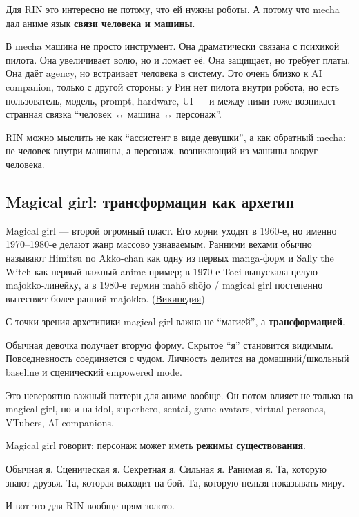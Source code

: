 Для RIN это интересно не потому, что ей нужны роботы. А потому что mecha
дал аниме язык \textbf{связи человека и машины}.

В mecha машина не просто инструмент. Она драматически связана с психикой
пилота. Она увеличивает волю, но и ломает её. Она защищает, но требует
платы. Она даёт agency, но встраивает человека в систему. Это очень
близко к AI companion, только с другой стороны: у Рин нет пилота внутри
робота, но есть пользователь, модель, prompt, hardware, UI --- и между
ними тоже возникает странная связка ``человек ↔ машина ↔ персонаж''.

RIN можно мыслить не как ``ассистент в виде девушки'', а как обратный
mecha: не человек внутри машины, а персонаж, возникающий из машины
вокруг человека.

\subsection*{Magical girl: трансформация как архетип}

Magical girl --- второй огромный пласт. Его корни уходят в 1960-е, но
именно 1970--1980-е делают жанр массово узнаваемым. Ранними вехами
обычно называют Himitsu no Akko-chan как одну из первых manga-форм и
Sally the Witch как первый важный anime-пример; в 1970-е Toei выпускала
целую majokko-линейку, а в 1980-е термин mahō shōjo /\hspace{0pt} magical girl
постепенно вытесняет более ранний majokko.
(\href{https://en.wikipedia.org/wiki/Magical_girl?utm_source=chatgpt.com}{Википедия})

С точки зрения архетипики magical girl важна не ``магией'', а
\textbf{трансформацией}.

Обычная девочка получает вторую форму. Скрытое ``я'' становится видимым.
Повседневность соединяется с чудом. Личность делится на
домашний/\hspace{0pt}школьный baseline и сценический empowered mode.

Это невероятно важный паттерн для аниме вообще. Он потом влияет не
только на magical girl, но и на idol, superhero, sentai, game avatars,
virtual personas, VTubers, AI companions.

Magical girl говорит: персонаж может иметь \textbf{режимы
существования}.

Обычная я. Сценическая я. Секретная я. Сильная я. Ранимая я. Та, которую
знают друзья. Та, которая выходит на бой. Та, которую нельзя показывать
миру.

И вот это для RIN вообще прям золото.

